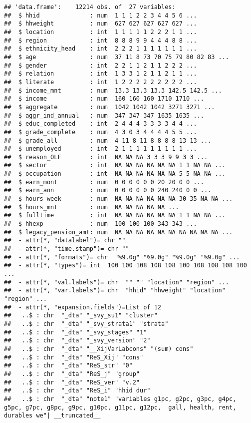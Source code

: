 \documentclass[]{article}
\begin{document}
\begin{verbatim}
## 'data.frame':    12214 obs. of  27 variables:
##  $ hhid              : num  1 1 1 2 2 3 4 4 5 6 ...
##  $ hhweight          : num  627 627 627 627 627 ...
##  $ location          : int  1 1 1 1 1 2 2 2 1 1 ...
##  $ region            : int  8 8 8 9 9 4 4 4 8 8 ...
##  $ ethnicity_head    : int  2 2 2 1 1 1 1 1 1 1 ...
##  $ age               : num  37 11 8 73 70 75 79 80 82 83 ...
##  $ gender            : int  2 2 1 1 2 1 1 2 2 2 ...
##  $ relation          : int  1 3 3 1 2 1 1 2 1 1 ...
##  $ literate          : int  1 2 2 2 2 2 2 2 2 2 ...
##  $ income_mnt        : num  13.3 13.3 13.3 142.5 142.5 ...
##  $ income            : num  160 160 160 1710 1710 ...
##  $ aggregate         : num  1042 1042 1042 3271 3271 ...
##  $ aggr_ind_annual   : num  347 347 347 1635 1635 ...
##  $ educ_completed    : int  2 4 4 4 3 3 3 3 4 4 ...
##  $ grade_complete    : num  4 3 0 3 4 4 4 4 5 5 ...
##  $ grade_all         : num  4 11 8 11 8 8 8 8 13 13 ...
##  $ unemployed        : int  2 1 1 1 1 1 1 1 1 1 ...
##  $ reason_OLF        : int  NA NA NA 3 3 3 9 9 3 3 ...
##  $ sector            : int  NA NA NA NA NA NA 1 1 NA NA ...
##  $ occupation        : int  NA NA NA NA NA NA 5 5 NA NA ...
##  $ earn_mont         : num  0 0 0 0 0 0 20 20 0 0 ...
##  $ earn_ann          : num  0 0 0 0 0 0 240 240 0 0 ...
##  $ hours_week        : num  NA NA NA NA NA NA 30 35 NA NA ...
##  $ hours_mnt         : num  NA NA NA NA NA ...
##  $ fulltime          : int  NA NA NA NA NA NA 1 1 NA NA ...
##  $ hhexp             : num  100 100 100 343 343 ...
##  $ legacy_pension_amt: num  NA NA NA NA NA NA NA NA NA NA ...
##  - attr(*, "datalabel")= chr ""
##  - attr(*, "time.stamp")= chr ""
##  - attr(*, "formats")= chr  "%9.0g" "%9.0g" "%9.0g" "%9.0g" ...
##  - attr(*, "types")= int  100 100 108 108 108 100 108 108 108 100 ...
##  - attr(*, "val.labels")= chr  "" "" "location" "region" ...
##  - attr(*, "var.labels")= chr  "hhid" "hhweight" "location" "region" ...
##  - attr(*, "expansion.fields")=List of 12
##   ..$ : chr  "_dta" "_svy_su1" "cluster"
##   ..$ : chr  "_dta" "_svy_strata1" "strata"
##   ..$ : chr  "_dta" "_svy_stages" "1"
##   ..$ : chr  "_dta" "_svy_version" "2"
##   ..$ : chr  "_dta" "__XijVarLabcons" "(sum) cons"
##   ..$ : chr  "_dta" "ReS_Xij" "cons"
##   ..$ : chr  "_dta" "ReS_str" "0"
##   ..$ : chr  "_dta" "ReS_j" "group"
##   ..$ : chr  "_dta" "ReS_ver" "v.2"
##   ..$ : chr  "_dta" "ReS_i" "hhid dur"
##   ..$ : chr  "_dta" "note1" "variables g1pc, g2pc, g3pc, g4pc, g5pc, g7pc, g8pc, g9pc, g10pc, g11pc, g12pc,  gall, health, rent, durables we"| __truncated__

\end{verbatim}
\end{document}
